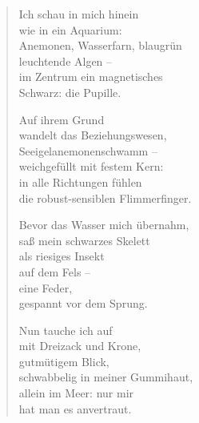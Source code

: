 
\cleartoverso


\begin{verse}

Ich schau in mich hinein\\
wie in ein Aquarium:\\
Anemonen, Wasserfarn, blaugrün\\
leuchtende Algen --\\
im Zentrum ein magnetisches\\
Schwarz: die Pupille.

Auf ihrem Grund\\
wandelt das Beziehungswesen,\\
Seeigelanemonenschwamm --\\
weichgefüllt mit festem Kern:\\
in alle Richtungen fühlen\\
die robust-sensiblen Flimmerfinger.

Bevor das Wasser mich übernahm,\\
saß mein schwarzes Skelett\\
als riesiges Insekt\\
auf dem Fels --\\
eine Feder,\\
gespannt vor dem Sprung.

Nun tauche ich auf\\
mit Dreizack und Krone,\\
gutmütigem Blick,\\
schwabbelig in meiner Gummihaut,\\
allein im Meer: nur mir\\
hat man es anvertraut.

\end{verse}

\cleartorecto



